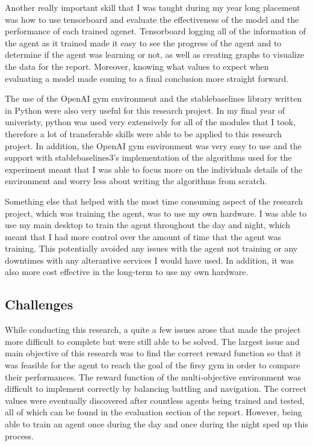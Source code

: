 Another really important skill that I was taught during my year long placement was how to use tensorboard and evaluate the effectiveness of the model and the performance of each trained agenet. Tensorboard logging all of the information of the agent as it trained made it easy to see the progress of the agent and to determine if the agent was learning or not, as well as creating graphs to visualize the data for the report. Moreover, knowing what values to expect when evaluating a model made coming to a final conclusion more straight forward.  

The use of the OpenAI gym environment and the stablebaselines library written in Python were also very useful for this research project. In my final year of univeristy, python was used very extensively for all of the modules that I took, therefore a lot of transferable skills were able to be applied to this research project. In addition, the OpenAI gym environment was very easy to use and the support with stablebaselines3's implementation of the algorithms used for the experiment meant that I was able to focus more on the individuals details of the environment and worry less about writing the algorithms from scratch. 

Something else that helped with the most time consuming aspect of the research project, which was training the agent, was to use my own hardware. I was able to use my main desktop to train the agent throughout the day and night, which meant that I had more control over the amount of time that the agent was training. This potentially avoided any issues with the agent not training or any downtimes with any alterantive services I would have used. In addition, it was also more cost effective in the long-term to use my own hardware.

\subsection{Challenges}

While conducting this research, a quite a few issues arose that made the project more difficult to complete but were still able to be solved. The largest issue and main objective of this research was to find the correct reward function so that it was feasible for the agent to reach the goal of the firsy gym in order to compare their performances. The reward function of the multi-objective environment was difficult to implement correctly by balancing battling and navigation. The correct values were eventually discovered after countless agents being trained and tested, all of which can be found in the evaluation section of the report. However, being able to train an agent once during the day and once during the night sped up this process. 

